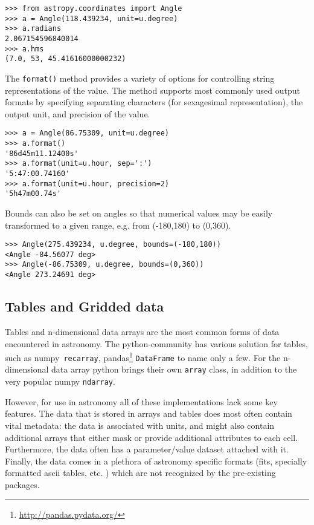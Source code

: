 \documentclass[traditabstract]{aa}
\begin{document}
\begin{verbatim}
>>> from astropy.coordinates import Angle
>>> a = Angle(118.439234, unit=u.degree)
>>> a.radians
2.067154596840014
>>> a.hms
(7.0, 53, 45.41616000000232)
\end{verbatim}

The \texttt{format()} method provides a variety of options for controlling
string representations of the value. The method supports most commonly used
output formats by specifying separating characters (for sexagesimal
representation), the output unit, and precision of the value.

\begin{verbatim}
>>> a = Angle(86.75309, unit=u.degree)
>>> a.format()
'86d45m11.12400s'
>>> a.format(unit=u.hour, sep=':')
'5:47:00.74160'
>>> a.format(unit=u.hour, precision=2)
'5h47m00.74s'
\end{verbatim}

Bounds can also be set on angles so that numerical values may be easily
transformed to a given range, e.g. from (-180,180) to (0,360).

\begin{verbatim}
>>> Angle(275.439234, u.degree, bounds=(-180,180))
<Angle -84.56077 deg>
>>> Angle(-86.75309, u.degree, bounds=(0,360))
<Angle 273.24691 deg>
\end{verbatim}

\subsection{Tables and Gridded data}


\label{sec:table}

Tables and n-dimensional data arrays are the most common forms of data
encountered in astronomy. The \gls{python}-community has various solution for
tables, such as \gls{numpy}\ \texttt{recarray},
pandas\footnote{\url{http://pandas.pydata.org/}} \texttt{DataFrame} to name
only a few. For the n-dimensional data array python brings their own
\texttt{array} class, in addition to the very popular \gls{numpy}
\texttt{ndarray}.

However, for use in astronomy all of these implementations lack some key
features. The data that is stored in arrays and tables does most often contain
vital metadata: the data is associated with units, and might also contain
additional arrays that either mask or provide additional attributes to each
cell. Furthermore, the data often has a parameter/value dataset attached with
it. Finally, the data comes in a plethora of astronomy specific formats (fits,
specially formatted ascii tables, etc. ) which are not recognized by the
pre-existing packages.
\end{document}
